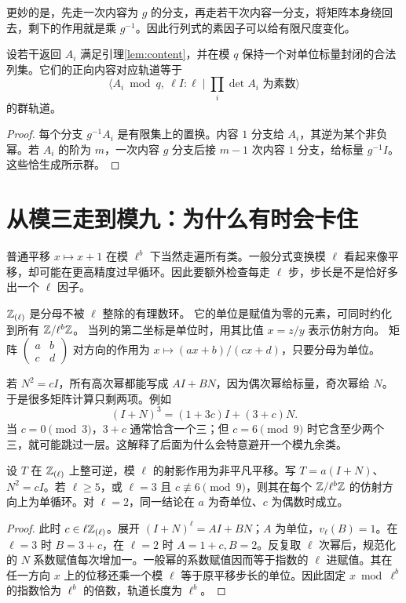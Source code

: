 更妙的是，先走一次内容为 $g$ 的分支，再走若干次内容一分支，将矩阵本身绕回去，剩下的作用就是乘 $g^{-1}$。因此行列式的素因子可以给有限尺度变化。
\begin{corollary}[有限正向对应的群化]\label{cor:finite-group}
设若干返回 $A_i$ 满足引理\ref{lem:content}，并在模 $q$ 保持一个对单位标量封闭的合法列集。它们的正向内容对应轨道等于
\[
\langle A_i\bmod q,\ \ell I:\ell\mid\prod_i\det A_i\text{ 为素数}\rangle
\]
的群轨道。
\end{corollary}
\begin{proof}
每个分支 $g^{-1}A_i$ 是有限集上的置换。内容 $1$ 分支给 $A_i$，其逆为某个非负幂。若 $A_i$ 的阶为 $m$，一次内容 $g$ 分支后接 $m-1$ 次内容 $1$ 分支，给标量 $g^{-1}I$。这些恰生成所示群。
\end{proof}

\section{从模三走到模九：为什么有时会卡住}
普通平移 $x\mapsto x+1$ 在模 $\ell^b$ 下当然走遍所有类。一般分式变换模 $\ell$ 看起来像平移，却可能在更高精度过早循环。因此要额外检查每走 $\ell$ 步，步长是不是恰好多出一个 $\ell$ 因子。
\begin{definition}[局部整数]
$\mathbb Z_{(\ell)}$ 是分母不被 $\ell$ 整除的有理数环。
它的单位是赋值为零的元素，可同时约化到所有 $\mathbb Z/\ell^b\mathbb Z$。
当列的第二坐标是单位时，用其比值 $x=z/y$ 表示仿射方向。
矩阵 $\left(\begin{smallmatrix}a&b\\c&d\end{smallmatrix}\right)$ 对方向的作用为
$x\mapsto(ax+b)/(cx+d)$，只要分母为单位。
\end{definition}
若 $N^2=cI$，所有高次幂都能写成 $A I+B N$，因为偶次幂给标量，奇次幂给 $N$。于是很多矩阵计算只剩两项。例如
\[(I+N)^3=(1+3c)I+(3+c)N.
\]
当 $c=0\pmod3$，$3+c$ 通常恰含一个三；但 $c=6\pmod9$ 时它含至少两个三，就可能跳过一层。这解释了后面为什么会特意避开一个模九余类。
\begin{lemma}[局部平移的逐层提升]\label{lem:local-cycle}
设 $T$ 在 $\mathbb Z_{(\ell)}$ 上整可逆，模 $\ell$ 的射影作用为非平凡平移。写 $T=a(I+N)$、$N^2=cI$。若 $\ell\ge5$，或 $\ell=3$ 且 $c\not\equiv6\pmod9$，则其在每个 $\mathbb Z/\ell^b\mathbb Z$ 的仿射方向上为单循环。对 $\ell=2$，同一结论在 $a$ 为奇单位、$c$ 为偶数时成立。
\end{lemma}
\begin{proof}
此时 $c\in\ell\mathbb Z_{(\ell)}$。展开 $(I+N)^\ell=A I+B N$；$A$ 为单位，$v_\ell(B)=1$。在 $\ell=3$ 时 $B=3+c$，在 $\ell=2$ 时 $A=1+c,B=2$。反复取 $\ell$ 次幂后，规范化的 $N$ 系数赋值每次增加一。一般幂的系数赋值因而等于指数的 $\ell$ 进赋值。其在任一方向 $x$ 上的位移还乘一个模 $\ell$ 等于原平移步长的单位。因此固定 $x\bmod\ell^b$ 的指数恰为 $\ell^b$ 的倍数，轨道长度为 $\ell^b$。
\end{proof}

